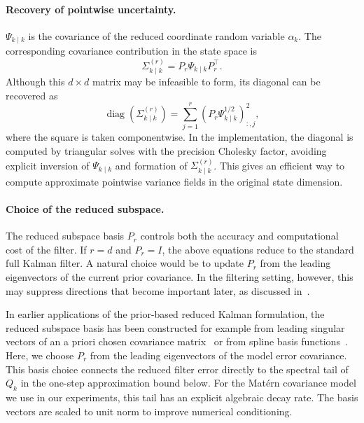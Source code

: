 \documentclass[a4paper,12pt]{article}
\begin{document}
\paragraph{Recovery of pointwise uncertainty.}
$\Psi_{k \mid k}$ is the covariance of the reduced coordinate random variable $\alpha_k$.
The corresponding covariance contribution in the state space is
\begin{equation}
    \Sigma_{k \mid k}^{(r)} = P_r \Psi_{k \mid k} P_{r}^{\top}.
\end{equation}
Although this $d \times d$ matrix may be infeasible to form, its diagonal can be recovered as
\begin{equation}
    \operatorname{diag}(\Sigma_{k \mid k}^{(r)})
    = \sum_{j=1}^{r} (P_r \Psi_{k \mid k}^{1/2})_{:, j}^{2},
\end{equation}
where the square is taken componentwise.
In the implementation, the diagonal is computed by triangular solves with the precision Cholesky factor, avoiding explicit inversion of $\Psi_{k \mid k}$ and formation of $\Sigma_{k \mid k}^{(r)}$.
This gives an efficient way to compute approximate pointwise variance fields in the original state dimension.

\paragraph{Choice of the reduced subspace.}
The reduced subspace basis $P_r$ controls both the accuracy and computational cost of the filter.
If $r=d$ and $P_r=I$, the above equations reduce to the standard full Kalman filter.
A natural choice would be to update $P_r$ from the leading eigenvectors of the current prior covariance.
In the filtering setting, however, this may suppress directions that become important later, as discussed in~\cite{solonen}.

In earlier applications of the prior-based reduced Kalman formulation, the reduced subspace basis has been constructed for example from leading singular vectors of an a priori chosen covariance matrix~\cite{xraykfdr} or from spline basis functions~\cite{opticalflowkfdr}.
Here, we choose $P_r$ from the leading eigenvectors of the model error covariance.
This basis choice connects the reduced filter error directly to the spectral tail of $Q_k$ in the one-step approximation bound below.
For the Matérn covariance model we use in our experiments, this tail has an explicit algebraic decay rate.
The basis vectors are scaled to unit norm to improve numerical conditioning.
\end{document}
